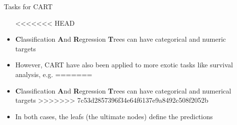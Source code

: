 \documentclass[11pt,compress,t,notes=noshow, xcolor=table]{beamer}
\begin{document}
\begin{vbframe}{Tasks for CART}
  \begin{itemize}
<<<<<<< HEAD
    \item \textbf{C}lassification \textbf{A}nd \textbf{R}egression \textbf{T}rees can have categorical and numeric targets
    \item However, CART have also been applied to more exotic tasks like survival analysis, e.g. 
=======
    \item \textbf{C}lassification \textbf{A}nd \textbf{R}egression \textbf{T}rees can have categorical and numerical targets
>>>>>>> 7c53d2857396f34e64f6137e9a8492c508f2052b
    \item In both cases, the leafs (the ultimate nodes) define the predictions
  \end{itemize}
  

\end{vbframe}
\end{document}
